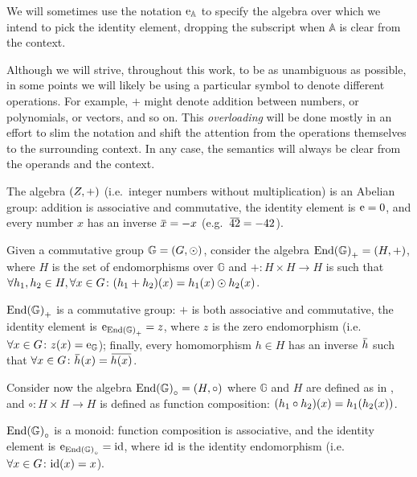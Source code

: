 We will sometimes use the notation \(\mathrm{e}_{\mathbb{A}}\) to specify the algebra over which we 
intend to pick the identity element, dropping the subscript when \(\mathbb{A}\) is clear from the 
context.
\begin{remark}  
  Although we will strive, throughout this work, to be as unambiguous as possible, in 
  some points we will likely be using a particular symbol to denote different operations.
  For example, \(+\) might denote addition between numbers, or polynomials, or vectors, and so on.
  This \emph{overloading} will be done mostly in an effort to slim the notation and shift the 
  attention from the operations themselves to the surrounding context. 
  In any case, the semantics will always be clear from the operands and the context. 
\end{remark}

\begin{example}
  The algebra \(\left(Z, +\right)\) (i.e.\ integer numbers without multiplication) 
  is an Abelian group: addition is associative and commutative, the identity element is 
  \(\mathrm{e} = 0\), and every number \(x\) has an inverse \(\inv{x} = -x\) (e.g.\  \(\inv{42} = -42\)). 
\end{example}

\begin{example}\label{ex:endo_group}
  Given a commutative group \(\mathbb{G} = \left(G, \odot\right)\), consider the algebra 
  \(\Endset{\mathbb{G}}_{+} = \Tuple{H, +}\), where \(H\) is the set of endomorphisms over 
  \(\mathbb{G}\) and \(+\colon H \times H \to H\) is such that 
  \(\forall h_1, h_2 \in H, \forall x \in G\colon \call{\Parens*{h_1 + h_2}}{x} = 
  \call{h_1}{x} \odot \call{h_2}{x}\).

  \(\Endset{\mathbb{G}}_{+}\) is a commutative group: \(+\) is both associative and 
  commutative, the identity element is \(\mathrm{e}_{\mathrm{End}\left(\mathbb{G}\right)_{+}} = z\), where
  \(z\) is the zero endomorphism (i.e.\  \(\forall x \in G\colon \call{z}{x} = 
  \id_{\mathbb{G}}\)); finally, every homomorphism \(h \in H\) has an inverse 
  \(\inv{h}\) such that \(\forall x \in G\colon \call{\inv{h}}{x} = \inv{\call{h}{x}}\).
\end{example}

\begin{example}\label{ex:endo_monoid}
  Consider now the algebra \(\Endset{\mathbb{G}}_{\circ} = \Tuple{H, \circ}\) 
  where \(\mathbb{G}\) and \(H\) are defined as in , and 
  \(\circ\colon H \times H \to H\) is defined as function composition: 
  \(\call{\Parens*{h_1 \circ h_2}}{x} = \call{h_1}{\call{h_2}{x}}\).
  
  \(\Endset{\mathbb{G}}_{\circ}\) is a monoid: function composition is associative, and the 
  identity element is \(\mathrm{e}_{\mathrm{End}\left(\mathbb{G}\right)_{\circ}} = \mathrm{id} \), where \(\mathrm{id} \) is the
  identity endomorphism (i.e.\  \(\forall x \in G\colon \call{\fooid}{x} = x\)). 
\end{example}


